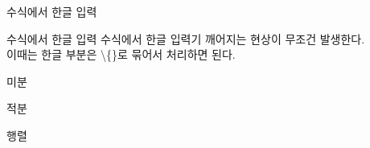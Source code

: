 \documentclass[ aspectratio=149,  14pt,blue,xcolor=pdftex,dvipsnames,table,handout,notes]{beamer}
\begin{document}
		\begin{frame}[t]{수식에서 한글 입력}

			\begin{block} {수식에서 한글 입력}
			수식에서 한글 입력기 깨어지는 현상이 무조건 발생한다.\\
			이때는 한글 부분은 \textbackslash \{\}로 묶어서 처리하면 된다.
			\end{block}

		
		\end{frame}

		\begin{frame}[t]{미분}

		
		\end{frame}


		\begin{frame}[t]{적분}

		
		\end{frame}


		\begin{frame}[t]{행렬}

		
		\end{frame}








		\begin{frame}[plain]
		\centering
		\scalebox{10}{BOX}

		
		\end{frame}

\end{document}

